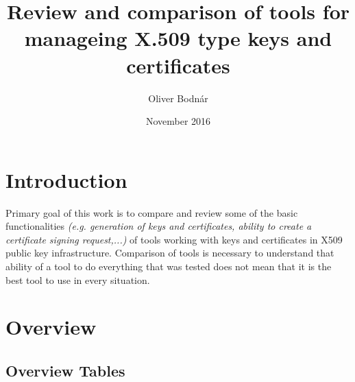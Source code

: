 \documentclass[10pt, a4paper]{report}
\title{Review and comparison of tools for manageing X.509 type keys and certificates}
\author{Oliver Bodnár}
\date{November 2016}
\begin{document}
\maketitle

\tableofcontents

\newpage

\part{Introduction}

Primary goal of this work is to compare and review some of the basic functionalities \textit{(e.g. generation of keys and certificates, ability to create a certificate signing request,...)} of tools working with keys and certificates in X509 public key infrastructure. Comparison of tools is necessary to understand that ability of a tool to do everything that was tested does not mean that it is the best tool to use in every situation.
\part{Overview}

\chapter{Overview Tables}
\end{document}
